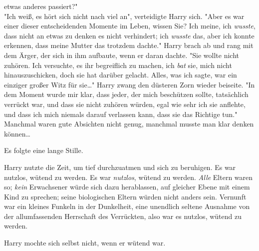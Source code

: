 {etwas anderes passiert?"\\ "Ich weiß, es hört sich nicht nach viel an", verteidigte Harry sich. "Aber es war einer dieser entscheidenden Momente im Leben, wissen Sie? Ich meine, ich \emph{wusste}, dass nicht an etwas zu denken es nicht verhindert; ich \emph{wusste} das, aber ich konnte erkennen, dass meine Mutter das trotzdem dachte." Harry brach ab und rang mit dem Ärger, der sich in ihm aufbaute, wenn er daran dachte. "Sie wollte nicht zuhören. Ich versuchte, es ihr begreiflich zu machen, ich \emph{bat} sie, mich nicht hinauszuschicken, doch sie hat darüber gelacht. Alles, was ich sagte, war ein einziger großer Witz für sie…" Harry zwang den düsteren Zorn wieder beiseite. "In dem Moment wurde mir klar, dass jeder, der mich beschützen sollte, tatsächlich verrückt war, und dass sie nicht zuhören würden, egal wie sehr ich sie anflehte, und dass ich mich niemals darauf verlassen kann, dass sie das Richtige tun."\\ Manchmal waren gute Absichten nicht genug, manchmal musste man klar denken können…

Es folgte eine lange Stille.

Harry nutzte die Zeit, um tief durchzuatmen und sich zu beruhigen. Es war nutzlos, wütend zu werden. Es war \emph{nutzlos}, wütend zu werden. \emph{Alle} Eltern waren so; \emph{kein} Erwachsener würde sich dazu herablassen, auf gleicher Ebene mit einem Kind zu sprechen; seine biologischen Eltern würden nicht anders sein. Vernunft war ein kleines Funkeln in der Dunkelheit, eine unendlich seltene Ausnahme von der allumfassenden Herrschaft des Verrückten, also war es nutzlos, wütend zu werden.

Harry mochte sich selbst nicht, wenn er wütend war.

}
